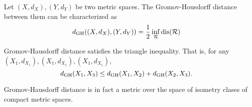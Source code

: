 \begin{definition}
    
\end{definition}

\begin{definition}
    
\end{definition}

\begin{proposition}
    Let $ (X, d_X), (Y, d_Y) $ be two metric spaces. The Gromov-Housdorff distance between them can be characterized as
    $$
        d_{\operatorname{GH}}((X, d_X), (Y, d_Y)) = \frac{1}{2} \inf_{\mathcal R} \operatorname{dis}(\mathcal R)
    $$  
\end{proposition}

\begin{lemma}
    Gromov-Hausdorff distance satisfies the triangle inequality. That is, for any $ (X_1, d_{X_1}), (X_1, d_{X_1}), (X_1, d_{X_1}) $,
    $$
        d_{\operatorname{GH}}(X_1, X_3) \leq d_{\operatorname{GH}}(X_1, X_2) + d_{\operatorname{GH}}(X_2, X_3).
    $$
\end{lemma}

\begin{theorem}
    Gromov-Hausdorff distance is in fact a metric over the space of isometry clases of compact metric spaces.    
\end{theorem}